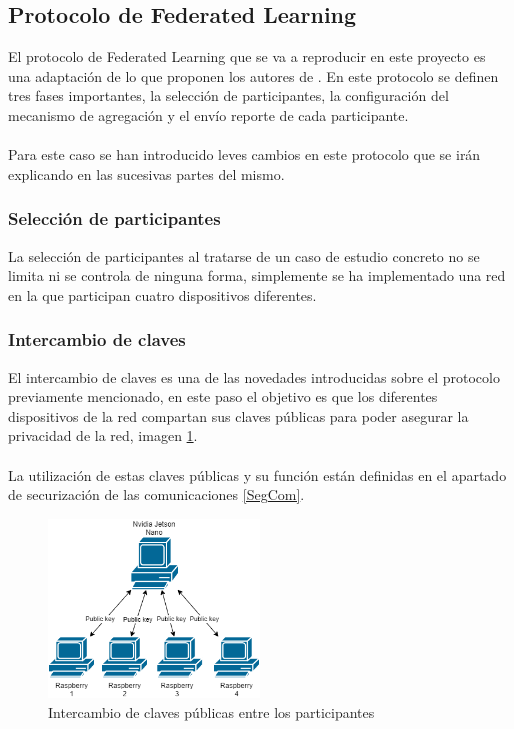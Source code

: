 \subsection{Protocolo de Federated Learning}
El protocolo de Federated Learning que se va a reproducir en este proyecto es una adaptación de lo que proponen los autores de \autocite{bonawitzFederatedLearningScale2019a}. En este protocolo se definen tres fases importantes, la selección de participantes, la configuración del mecanismo de agregación y el envío reporte de cada participante.
\\\\
Para este caso se han introducido leves cambios en este protocolo que se irán explicando en las sucesivas partes del mismo.  

\subsubsection{Selección de participantes}
La selección de participantes al tratarse de un caso de estudio concreto no se limita ni se controla de ninguna forma, simplemente se ha implementado una red en la que participan cuatro dispositivos diferentes.

\subsubsection{Intercambio de claves}
El intercambio de claves es una de las novedades introducidas sobre el protocolo previamente mencionado, en este paso el objetivo es que los diferentes dispositivos de la red compartan sus claves públicas para poder asegurar la privacidad de la red, imagen \ref{fig:PublicKeyShare}. 
\\ \\
La utilización de estas claves públicas y su función están definidas en el apartado de securización de las comunicaciones \ref{SegCom}.
\begin{figure}[H]
    \centering
    \includegraphics[width=0.5\textwidth]{Figuras/Network_public_key.png}    
    \caption{Intercambio de claves públicas entre los participantes} 
    \label{fig:PublicKeyShare}
\end{figure}

